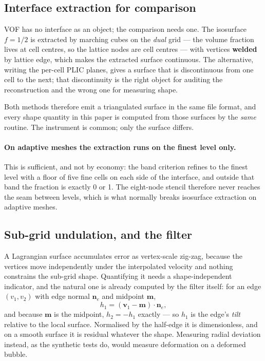 \subsection{Interface extraction for comparison}
\label{sec:mc}

VOF has no interface as an object; the comparison needs one. The isosurface
$f = 1/2$ is extracted by marching cubes on the \emph{dual} grid --- the volume
fraction lives at cell centres, so the lattice nodes are cell centres --- with
vertices \textbf{welded} by lattice edge, which makes the extracted surface
continuous. The alternative, writing the per-cell PLIC planes, gives a surface
that is discontinuous from one cell to the next; that discontinuity is the right
object for auditing the reconstruction and the wrong one for measuring shape.

Both methods therefore emit a triangulated surface in the same file format, and
every shape quantity in this paper is computed from those surfaces by the
\emph{same} routine. The instrument is common; only the surface differs.

\paragraph{On adaptive meshes the extraction runs on the finest level only.}
This is sufficient, and not by economy: the band criterion refines to the finest
level with a floor of five fine cells on each side of the interface, and outside
that band the fraction is exactly 0 or 1. The eight-node stencil therefore never
reaches the seam between levels, which is what normally breaks isosurface
extraction on adaptive meshes.

\subsection{Sub-grid undulation, and the filter}
\label{sec:tsur}


A Lagrangian surface accumulates error as vertex-scale zig-zag, because the
vertices move independently under the interpolated velocity and nothing
constrains the sub-grid shape. Quantifying it needs a shape-independent
indicator, and the natural one is already computed by the filter itself: for an
edge $(v_1,v_2)$ with edge normal $\mathbf{n}_e$ and midpoint $\mathbf{m}$,
\begin{equation}
h_1 = (\mathbf{v}_1 - \mathbf{m})\cdot\mathbf{n}_e ,
\end{equation}
and because $\mathbf{m}$ is the midpoint, $h_2 = -h_1$ exactly --- so $h_1$ is
the edge's \emph{tilt} relative to the local surface. Normalised by the
half-edge it is dimensionless, and on a smooth surface it is residual whatever
the shape. Measuring radial deviation instead, as the synthetic tests do, would
measure deformation on a deformed bubble.

